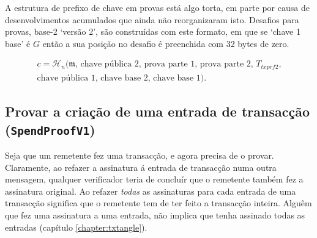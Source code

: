 
A estrutura de prefixo de chave em provas está algo torta, em parte por causa de desenvolvimentos acumulados que ainda não reorganizaram isto. Desafios para provas, base-2 `versão 2', são construídas com este formato, em que se `chave 1 base' é $G$ então a sua posição no desafio é preenchida com 32 bytes de zero.  

\vspace{.175cm}
\begin{align*}
c = \mathcal{H}_n(\mathfrak{m}\textrm{, chave pública 2, prova parte 1, prova parte 2, $T_{txprf2}$,}\\ \textrm{chave pública 1, chave base 2, chave base 1}) .
\end{align*}



\subsection{Provar a criação de uma entrada de transacção ({\tt SpendProofV1})}
\label{subsec:proofs-input-creation-spendproof}

Seja que um remetente fez uma transacção, e agora precisa de o provar. Claramente, ao refazer a assinatura á entrada de transacção numa outra mensagem, qualquer verificador teria de concluír que o remetente também fez a assinatura original. Ao refazer {\em todas} as assinaturas para cada entrada de uma transacção significa que o remetente tem de ter feito a transacção inteira.
\newline Alguêm que fez uma assinatura a uma entrada, não implica que tenha assinado todas as entradas (capítulo \ref{chapter:txtangle}). 

